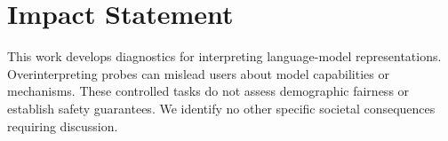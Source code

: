 \documentclass{article}
\begin{document}
\FloatBarrier
\label{sec:main-end}

\section*{Impact Statement}
This work develops diagnostics for interpreting language-model representations. Overinterpreting probes can mislead users about model capabilities or mechanisms. These controlled tasks do not assess demographic fairness or establish safety guarantees. We identify no other specific societal consequences requiring discussion.



\appendix
\onecolumn








\end{document}
